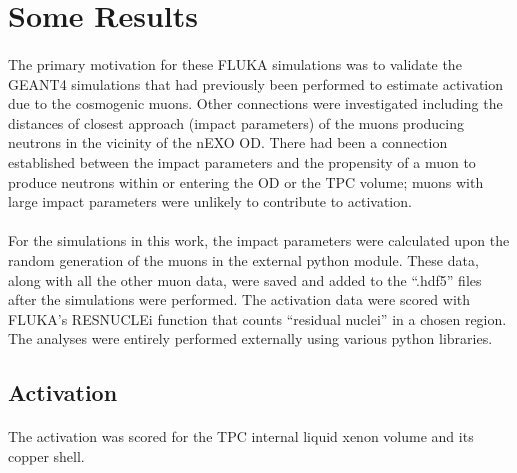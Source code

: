 \section{Some Results}
\paragraph{}
The primary motivation for these FLUKA simulations was to validate the GEANT4 simulations that had previously been performed to estimate activation due to the cosmogenic muons. Other connections were investigated including the distances of closest approach (impact parameters) of the muons producing neutrons in the vicinity of the nEXO OD. There had been a connection established between the impact parameters and the propensity of a muon to produce neutrons within or entering the OD or the TPC volume; muons with large impact parameters were unlikely to contribute to activation.

\paragraph{}
For the simulations in this work, the impact parameters were calculated upon the random generation of the muons in the external python module. These data, along with all the other muon data, were saved and added to the ``.hdf5'' files after the simulations were performed. The activation data were scored with FLUKA's RESNUCLEi function that counts ``residual nuclei'' in a chosen region. The analyses were entirely performed externally using various python libraries.

\subsection{Activation}

\paragraph{}
The activation was scored for the TPC internal liquid xenon volume and its copper shell. 